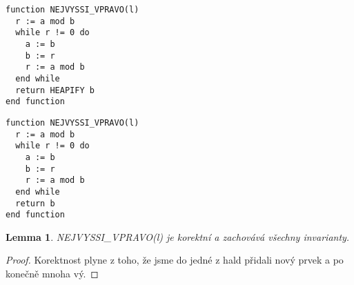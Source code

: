 \documentclass[12pt,a4paper]{article}
\theoremstyle{plain}
\newtheorem{lemma}[thm]{Lemma}
\begin{document}
\begin{lstlisting}
function NEJVYSSI_VPRAVO(l)
  r := a mod b
  while r != 0 do
    a := b
    b := r
    r := a mod b
  end while
  return HEAPIFY b
end function
\end{lstlisting}

\begin{lstlisting}
function NEJVYSSI_VPRAVO(l)
  r := a mod b
  while r != 0 do
    a := b
    b := r
    r := a mod b
  end while
  return b
end function
\end{lstlisting}


\begin{lemma} NEJVYSSI\_VPRAVO(l) je korektní a zachovává všechny invarianty.
\end{lemma}
\begin{proof}
Korektnost plyne z toho, že jsme do jedné z hald přidali nový prvek a po konečně mnoha vý.
\end{proof}
\end{document}
